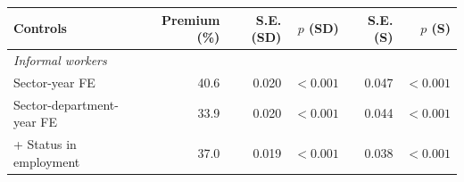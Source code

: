 \begin{tabular}{lrrrrr}
\toprule
    Controls & Premium (\%) & S.E. (SD) & $p$ (SD) & S.E. (S) & $p$ (S) \\
    \midrule
\multicolumn{6}{l}{\textit{Informal workers}} \\
Sector-year FE & 40.6 & 0.020 & $<0.001$ & 0.047 & $<0.001$ \\
Sector-department-year FE & 33.9 & 0.020 & $<0.001$ & 0.044 & $<0.001$ \\
+ Status in employment & 37.0 & 0.019 & $<0.001$ & 0.038 & $<0.001$\\
\bottomrule\end{tabular}
